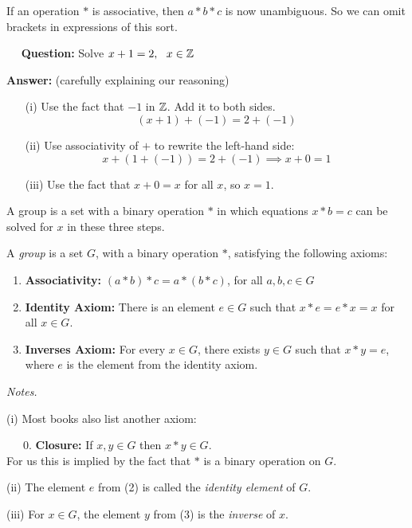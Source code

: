 \documentclass[10pt]{scrartcl}
\begin{document}
If an operation $*$ is associative, then $a*b*c$ is now unambiguous. So we can omit brackets in expressions of this sort.\\


\begin{example} 

 ~~ \textbf{Question:} Solve $x + 1 = 2, ~~ x \in \mathbb{Z}$
 
\textbf{Answer:} (carefully explaining our reasoning) \begin{enumerate}
 \item[(i)] Use the fact that $-1$ in $\mathbb{Z}$. Add it to both sides.
 \[(x+1) + (-1) =  2 + (-1)\]
 \item[(ii)] Use associativity of $+$ to rewrite the left-hand side:
 \[x + (1 + (-1)) = 2 + (-1) \implies x + 0 = 1\]
 \item[(iii)] Use the fact that $x + 0 = x$ for all $x$, so $x = 1$.
 \end{enumerate}
 \end{example}

A group is a set with a binary operation $*$ in which equations $x * b = c$ can be solved for $x$ in these three steps.\\

\begin{definition} A \emph{group} is a set $G$, with a binary operation $*$, satisfying the following axioms:\begin{enumerate}
\item \textbf{Associativity:} $(a*b)*c = a*(b*c)$, for all $a,b,c \in G$
\item \textbf{Identity Axiom:} There is an element $e \in G$ such that $x * e = e*x = x$ for all $x \in G$.
\item \textbf{Inverses Axiom:} For every $x \in G$, there exists $y \in G$ such that $x * y = e$, where $e$ is the element from the identity axiom.
\end{enumerate}
\end{definition}

\emph{Notes.}

 (i) Most books also list another axiom:
 
 ~~~0. \textbf{Closure: }If $x,y \in G$ then $x * y \in G$.\\
For us this is implied by the fact that $*$ is a binary operation on $G$.

(ii) The element $e$ from (2) is called the \emph{identity element} of $G$.

(iii) For $x \in G$, the element $y$ from (3) is the \emph{inverse} of $x$.\\
\end{document}
